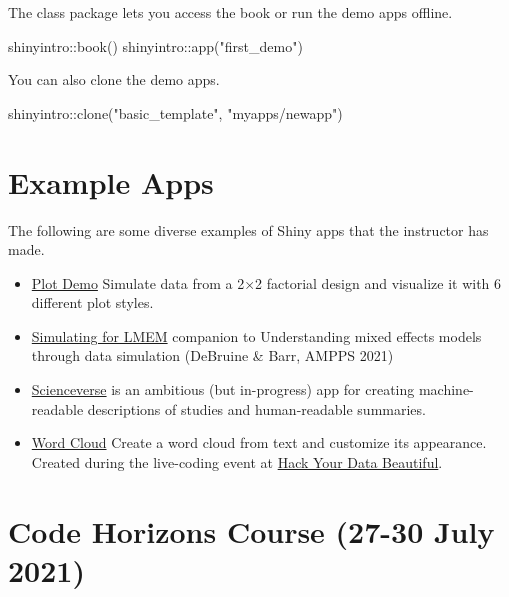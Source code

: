 \documentclass[
  oneside]{book}
\newenvironment{Shaded}{\begin{snugshade}}{\end{snugshade}}
\newcommand{\FunctionTok}[1]{\textcolor[rgb]{0.00,0.00,0.00}{#1}}
\newcommand{\NormalTok}[1]{#1}
\newcommand{\SpecialCharTok}[1]{\textcolor[rgb]{0.00,0.00,0.00}{#1}}
\newcommand{\StringTok}[1]{\textcolor[rgb]{0.31,0.60,0.02}{#1}}
\providecommand{\tightlist}{%
  \setlength{\itemsep}{0pt}\setlength{\parskip}{0pt}}
\begin{document}
The class package lets you access the book or run the demo apps offline.

\begin{Shaded}
\begin{Highlighting}[]
\NormalTok{shinyintro}\SpecialCharTok{::}\FunctionTok{book}\NormalTok{()}
\NormalTok{shinyintro}\SpecialCharTok{::}\FunctionTok{app}\NormalTok{(}\StringTok{"first\_demo"}\NormalTok{)}
\end{Highlighting}
\end{Shaded}

You can also clone the demo apps.

\begin{Shaded}
\begin{Highlighting}[]
\NormalTok{shinyintro}\SpecialCharTok{::}\FunctionTok{clone}\NormalTok{(}\StringTok{"basic\_template"}\NormalTok{, }\StringTok{"myapps/newapp"}\NormalTok{)}
\end{Highlighting}
\end{Shaded}

\hypertarget{example-apps}{%
\section{Example Apps}\label{example-apps}}

The following are some diverse examples of Shiny apps that the instructor has made.

\begin{itemize}
\tightlist
\item
  \href{https://shiny.psy.gla.ac.uk/debruine/plotdemo/}{Plot Demo} Simulate data from a 2×2 factorial design and visualize it with 6 different plot styles.
\item
  \href{https://shiny.psy.gla.ac.uk/lmem_sim/}{Simulating for LMEM} companion to Understanding mixed effects models through data simulation (DeBruine \& Barr, AMPPS 2021)
\item
  \href{http://shiny.ieis.tue.nl/scienceverse/}{Scienceverse} is an ambitious (but in-progress) app for creating machine-readable descriptions of studies and human-readable summaries.
\item
  \href{https://shiny.psy.gla.ac.uk/debruine/wordcloud/}{Word Cloud} Create a word cloud from text and customize its appearance. Created during the live-coding event at \href{https://psyteachr.github.io/hack-your-data/}{Hack Your Data Beautiful}.
\end{itemize}

\hypertarget{code-horizons-course-27-30-july-2021}{%
\section{Code Horizons Course (27-30 July 2021)}\label{code-horizons-course-27-30-july-2021}}
\end{document}
